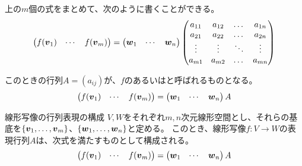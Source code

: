 \documentclass[../../../topic_linear-algebra]{subfiles}
\begin{document}
上の$m$個の式をまとめて、次のように書くことができる。
\begin{equation*}
  \begin{pmatrix}
    f(\vb*{v}_1) & \cdots & f(\vb*{v}_m)
  \end{pmatrix} 
  = \begin{pmatrix}
    \vb*{w}_1 & \cdots & \vb*{w}_n
  \end{pmatrix} \begin{pmatrix} 
  a_{11} & a_{12} & \dots  & a_{1n} \\
  a_{21} & a_{22} & \dots  & a_{2n} \\
  \vdots & \vdots & \ddots & \vdots \\
  a_{m1} & a_{m2} & \dots  & a_{mn}
\end{pmatrix} 
\end{equation*}

\br

このときの行列$A = (a_{ij})$が、$f$のあるいはと呼ばれるものとなる。
\begin{equation*}
  \begin{pmatrix}
    f(\vb*{v}_1) & \cdots & f(\vb*{v}_m)
  \end{pmatrix} = \begin{pmatrix}
    \vb*{w}_1 & \cdots & \vb*{w}_n
  \end{pmatrix} A
\end{equation*}

\br

\begin{theorem*}{線形写像の行列表現の構成}
  $V, W$をそれぞれ$m,n$次元線形空間とし、それらの基底を$\{ \vb*{v}_1, \ldots, \vb*{v}_m \}$、$\{ \vb*{w}_1, \ldots, \vb*{w}_n \}$と定める。
  このとき、線形写像$f\colon V \to W$の表現行列$A$は、次式を満たすものとして構成される。
  \begin{equation*}
    \begin{pmatrix}
      f(\vb*{v}_1) & \cdots & f(\vb*{v}_m)
    \end{pmatrix} = \begin{pmatrix}
      \vb*{w}_1 & \cdots & \vb*{w}_n
    \end{pmatrix} A
  \end{equation*}
\end{theorem*}
\end{document}

